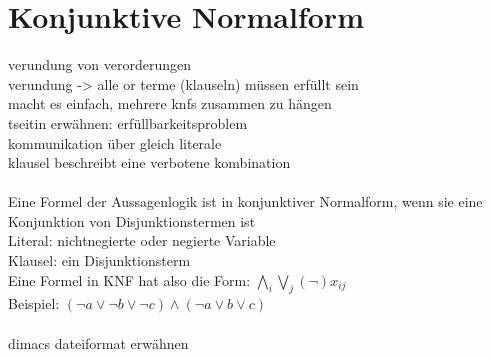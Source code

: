 \section{Konjunktive Normalform}
\label{sec:knf}


verundung von verorderungen\\
verundung -> alle or terme (klauseln) müssen erfüllt sein\\
macht es einfach, mehrere knfs zusammen zu hängen\\
tseitin erwähnen: erfüllbarkeitsproblem\\
kommunikation über gleich literale\\
klausel beschreibt eine verbotene kombination\\
~\\
Eine Formel der Aussagenlogik ist in konjunktiver Normalform, wenn sie eine Konjunktion von Disjunktionstermen ist\\
Literal: nichtnegierte oder negierte Variable\\
Klausel: ein Disjunktionsterm\\
Eine Formel in KNF hat also die Form: \newline \newline $ \bigwedge\limits_{i} \bigvee\limits_{j} (\neg)x_{ij} $\\
Beispiel: $ (\neg a \vee \neg b \vee \neg c) \wedge (\neg a \vee b \vee c) $\\
~\\
dimacs dateiformat erwähnen